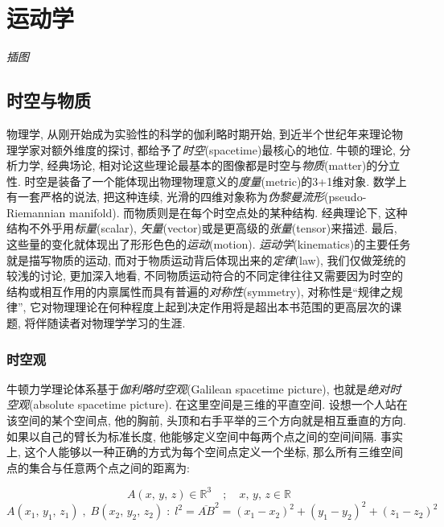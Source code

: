 \chapter{运动学}\label{2}

\emph{插图}

 

\section{时空与物质}\label{2-1}

物理学, 从刚开始成为实验性的科学的伽利略时期开始, 到近半个世纪年来理论物理学家对额外维度的探讨, 都给予了\emph{时空}(spacetime)最核心的地位. 牛顿的理论, 分析力学, 经典场论, 相对论这些理论最基本的图像都是时空与\emph{物质}(matter)的分立性. 时空是装备了一个能体现出物理物理意义的\emph{度量}(metric)的3+1维对象. 数学上有一套严格的说法, 把这种连续, 光滑的四维对象称为\emph{伪黎曼流形}(pseudo-Riemannian manifold). 而物质则是在每个时空点处的某种结构. 经典理论下, 这种结构不外乎用\emph{标量}(scalar), \emph{矢量}(vector)或是更高级的\emph{张量}(tensor)来描述. 最后, 这些量的变化就体现出了形形色色的\emph{运动}(motion). \emph{运动学}(kinematics)的主要任务就是描写物质的运动, 而对于物质运动背后体现出来的\emph{定律}(law), 我们仅做笼统的较浅的讨论, 更加深入地看, 不同物质运动符合的不同定律往往又需要因为时空的结构或相互作用的内禀属性而具有普遍的\emph{对称性}(symmetry), 对称性是``规律之规律'', 它对物理理论在何种程度上起到决定作用将是超出本书范围的更高层次的课题, 将伴随读者对物理学学习的生涯.

\subsection{时空观}\label{2-1-1}

牛顿力学理论体系基于\emph{伽利略时空观}(Galilean spacetime picture), 也就是\emph{绝对时空观}(absolute spacetime picture). 在这里空间是三维的平直空间. 设想一个人站在该空间的某个空间点, 他的胸前, 头顶和右手平举的三个方向就是相互垂直的方向. 如果以自己的臂长为标准长度, 他能够定义空间中每两个点之间的空间间隔. 事实上, 这个人能够以一种正确的方式为每个空间点定义一个坐标, 那么所有三维空间点的集合与任意两个点之间的距离为:

\[A(x,\,y,\,z)\in\mathbb{R}^3 \quad;\quad x,\,y,\,z\in\mathbb{R}\]
\[A(x_1,\,y_1,\,z_1)\;,\;B(x_2,\,y_2,\,z_2)\;:\;l^2=\overline{AB}^2=(x_1-x_2)^2+(y_1-y_2)^2+(z_1-z_2)^2\]

